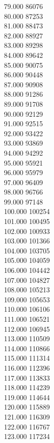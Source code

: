 { 79.000	86076 \\
 80.000	87253 \\
 81.000	88473 \\
 82.000	88927 \\
 83.000	89298 \\
 84.000	89642 \\
 85.000	90075 \\
 86.000	90448 \\
 87.000	90908 \\
 88.000	91286 \\
 89.000	91708 \\
 90.000	92129 \\
 91.000	92515 \\
 92.000	93422 \\
 93.000	93869 \\
 94.000	94292 \\
 95.000	95921 \\
 96.000	95979 \\
 97.000	96409 \\
 98.000	96766 \\
 99.000	97148 \\
 100.000	100254 \\
 101.000	100495 \\
 102.000	100933 \\
 103.000	101366 \\
 104.000	103705 \\
 105.000	104059 \\
 106.000	104442 \\
 107.000	104827 \\
 108.000	105213 \\
 109.000	105653 \\
 110.000	106106 \\
 111.000	106521 \\
 112.000	106945 \\
 113.000	110509 \\
 114.000	110866 \\
 115.000	111314 \\
 116.000	112396 \\
 117.000	113833 \\
 118.000	114239 \\
 119.000	114644 \\
 120.000	115889 \\
 121.000	116309 \\
 122.000	116767 \\
 123.000	117234 \\
}
